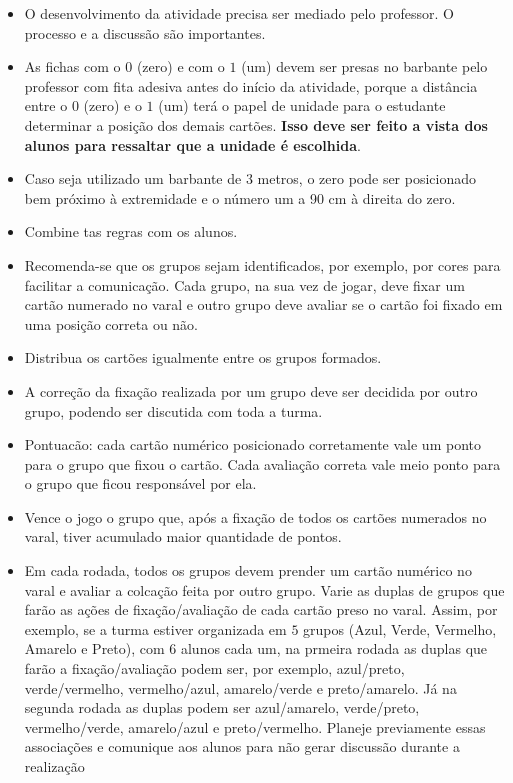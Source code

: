 \begin{multicols}{2}
\begin{itemize}
  \item O desenvolvimento da atividade precisa ser mediado pelo professor. O processo e a discussão são importantes.
  \item As fichas com o $0$ (zero) e com o $1$ (um) devem ser presas no barbante pelo professor com fita adesiva antes do início da atividade, porque a distância entre o $0$ (zero) e o $1$ (um) terá o papel de unidade para o estudante determinar a posição dos demais cartões. {\bf Isso deve ser feito a vista dos alunos para ressaltar que a unidade é escolhida}. 
  \item Caso seja utilizado um barbante de $3$ metros, o zero pode ser posicionado bem próximo à extremidade e o número um a 90 cm à direita do zero.
  \item Combine tas regras com os alunos.
  \item Recomenda-se que os grupos sejam identificados, por exemplo, por cores para facilitar a comunicação. Cada grupo, na sua vez de jogar, deve fixar um cartão numerado no varal e outro grupo deve avaliar se o cartão foi fixado em uma posição correta ou não.
  \item Distribua os cartões igualmente entre os grupos formados. 
  \item A correção da fixação realizada por um grupo deve ser decidida por outro grupo, podendo ser discutida com toda a turma. 
  \item Pontuacão: cada cartão numérico posicionado corretamente vale um ponto para o grupo que fixou o cartão. Cada avaliação correta vale meio ponto para o grupo que ficou responsável por ela. 
  \item Vence o jogo o grupo que, após a fixação de todos os cartões numerados no varal, tiver acumulado maior quantidade de pontos. 
  \item Em cada rodada, todos os grupos devem prender um cartão numérico no varal e avaliar a colcação feita por outro grupo. Varie as duplas de grupos que farão as ações de fixação/avaliação de cada cartão preso no varal. Assim, por exemplo, se a turma estiver organizada em $5$ grupos (Azul, Verde, Vermelho, Amarelo e Preto), com 6 alunos cada um, na prmeira rodada as duplas que farão a fixação/avaliação podem ser, por exemplo, azul/preto, verde/vermelho, vermelho/azul, amarelo/verde e preto/amarelo. Já na segunda rodada as duplas podem ser azul/amarelo, verde/preto, vermelho/verde, amarelo/azul e preto/vermelho. Planeje previamente essas associações e comunique aos alunos para não gerar discussão durante a realização 

\end{itemize}
\end{multicols}
